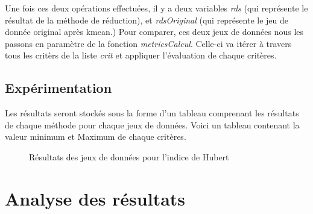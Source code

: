 Une fois ces deux opérations effectuées, il y a deux variables \textit{rds} (qui représente le résultat de la méthode de réduction), et \textit{rdsOriginal} (qui représente le jeu de
donnée original après kmean.) Pour comparer, ces deux jeux de données nous les passons en paramètre de la fonction \textit{metricsCalcul}.
Celle-ci va itérer à travers tous les critèrs de la liste \textit{crit} et appliquer l'évaluation de chaque critères.

\subsection{Expérimentation}
Les résultats seront stockés sous la forme d'un tableau comprenant les résultats de chaque méthode pour chaque jeux de données. 
Voici un tableau contenant la valeur minimum et Maximum de chaque critères.

\begin{center}
    \begin{figure}[!ht] 
        \caption{Résultats des jeux de données pour l'indice de Hubert}
    \end{figure}

\end{center}


\section{Analyse des résultats}

